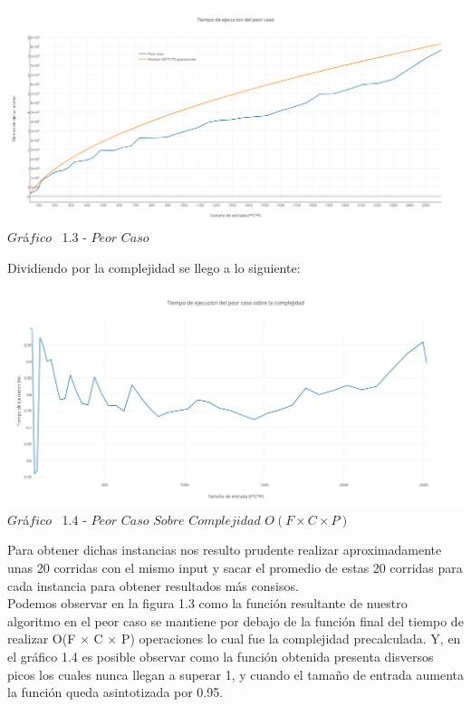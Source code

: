\vspace*{0.3cm} \vspace*{0.3cm}
  \begin{center}
\includegraphics[scale=0.4]{./EJ1/peorcaso.png}
{$Gr$\'a$fico$ \ 1.3 - $Peor$ $Caso$}
  \end{center}
  \vspace*{0.3cm}

Dividiendo por la complejidad se llego a lo siguiente:\\

\vspace*{0.3cm} \vspace*{0.3cm}
  \begin{center}
\includegraphics[scale=0.5]{./EJ1/peorcaso1.png}
{$Gr$\'a$fico$ \ 1.4 - $Peor$ $Caso$ $Sobre$ $Complejidad$ $O(F \times C \times P)$}
  \end{center}
  \vspace*{0.3cm}

 Para obtener dichas instancias nos resulto prudente realizar aproximadamente unas 20 corridas con el mismo input y sacar el promedio de estas 20 corridas para cada instancia para obtener resultados m\'as consisos.\\ 

Podemos observar en la figura 1.3 como la funci\'on resultante de nuestro algoritmo en el peor caso se mantiene por debajo de la funci\'on final del tiempo de realizar O(F $\times$ C $\times$ P) operaciones lo cual fue la complejidad precalculada. Y, en el gr\'afico 1.4 es posible observar como la funci\'on obtenida presenta disversos picos los cuales nunca llegan a superar 1, y cuando el tamaño de entrada aumenta la funci\'on queda asintotizada por 0.95.\\

